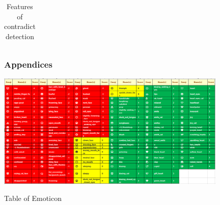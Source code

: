 \documentclass{beamer}
\begin{document}
\begin{frame}
{\begin{table}[]
\begin{tabular}{|l|l|lll}
		
		\end{tabular}
		\caption{Features of contradict detection}
		\label{tab:3}
\end{table}}

\end{frame}





\begin{frame}
\frametitle{Appendices}
\includegraphics[width=110mm]{emo.png}	\\
\begin{center}
	Table of Emoticon
\end{center}

\end{frame}
\end{document}
